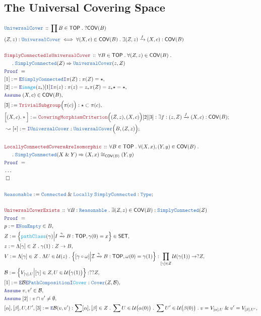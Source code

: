 \documentclass[12pt]{scrartcl}
\newcommand{\TYPE}[1]{\textcolor{NavyBlue}{\mathtt{#1}}}
\newcommand{\FUNC}[1]{\textcolor{Cerulean}{\mathtt{#1}}}
\newcommand{\LOGIC}[1]{\textcolor{Blue}{\mathtt{#1}}}
\newcommand{\THM}[1]{\textcolor{Maroon}{\mathtt{#1}}}
\renewcommand{\.}{\; . \;}
\newcommand{\de}{: \kern 0.1pc =}
\newcommand{\Theorem}[2]{& \THM{#1} \, :: \, #2 \\ & \Proof = \\ }
\newcommand{\DeclareType}[2]{& \TYPE{#1} \, :: \, #2 \\}
\newcommand{\DefineType}[3]{& #1 : \TYPE{#2} \iff #3 \\}
\newcommand{\NewLine}{\\ & \kern 1pc}
\newcommand{\Page}[1]{ \begin{align*} #1 \end{align*}   }
\newcommand{\NoProof}{ & \ldots \\ \EndProof}
\renewcommand{\And}{\; \& \;}
\newcommand{\Imply}{\Rightarrow}
\newcommand{\Intro}{\LOGIC{I}}
\newcommand{\Elim}{\LOGIC{E}}
\newcommand{\Type}{\TYPE{Type}}
\newcommand{\Arrow}{\xrightarrow}
\newcommand{\Say}[3]{& #1 \de #2 : #3, \\}
\newcommand{\SayIn}[3]{& #1 \de #2 \in #3, \\}
\newcommand{\Conclude}[3]{& #1 \de #2 : #3; \\}
\newcommand{\DeriveConclude}[3]{& \leadsto #1 \de #2 : #3 ; \\}
\newcommand{\Assume}[2]{& \LOGIC{Assume} \; #1 : #2, \\}
\newcommand{\AssumeIn}[2]{& \LOGIC{Assume} \; #1 \in #2, \\}
\newcommand{\QED}{\; \square}
\newcommand{\EndProof}{& \QED \\}
\newcommand{\Proof}{\LOGIC{Proof} \; }
\newcommand{\B}{\mathcal{B}}
\newcommand{\I}{\mathcal{I}}
\newcommand{\SET}{\mathsf{SET}}
\newcommand{\TOP}{\mathsf{TOP}}
\newcommand{\U}{\mathcal{U}}
\newcommand{\COV}{\mathsf{COV}}
\begin{document}
\subsection{The Universal Covering Space}
\Page{
	\DeclareType{UniversalCover}{\prod B \in \TOP \. ?\COV(B)  }
	\DefineType{(Z,z)}{UniversalCover}{
		\forall (X,c) \in \COV(B) \. 
		\exists (Z,z) \Arrow{f} (X,c) : \COV(B)
	}
	\\
	\Theorem{SimplyConnectedIsUniversalCover}
	{
		\forall B \in \TOP \.
		\forall ( Z, z) \in \COV(B) \. \NewLine \. 
		\TYPE{SimplyConnected}(Z) \Imply
		\TYPE{UniversalCover}(z,Z)
	}
	\Say{[1]}{\Elim \TYPE{SimplyConnected} \Intro \pi(Z)}
	{
		\pi(Z) = \star
	}
	\Say{[2]}{\Elim \FUNC{image}(z_*) [1] \Intro \pi(z)}
	{ 
		\pi(z) = z_* \pi(Z) = z_* \star = \star
	}
	\AssumeIn{(X,c)}{\COV(B)}
	\Say{[3]}{\THM{TrivialSubgroup}\Big( \pi(c) \Big)}{ \star \subset \pi(c) }
	\Conclude{\Big[(X,c).*\Big]}
	{
		\THM{CoveringMorphismCriterion}\Big((Z,z),(X,c)\Big)[2][3] 
	}
	{
		\exists f : (z,Z) \Arrow{f} (X,c) : \COV(B) 
	}
	\DeriveConclude{[*]}{\Intro \TYPE{UniversalCover}}
	{
		\TYPE{UniversalCover}\Big( B, (Z,z) \Big)
	}
	\\
	\Theorem{LocallyConnectedCoversAreIsomorphic}
	{
		\forall B \in \TOP \.
		\forall (X,x),(Y,y) \in \COV(B) \. \NewLine \. 
		\TYPE{SimplyConnected}(X \And Y) 
		\Imply
		(X,x) \cong_{\COV(B)} (Y,y)
	}
	\NoProof
	\\
	\Conclude{\TYPE{Reasonable}}{ \TYPE{Connected} \And \TYPE{Locally}\;\TYPE{SimplyConnected}}{\Type}
	\\
	\Theorem{UniversalCoverExists}
	{
		\forall B : \TYPE{Reasonable} \.  
		\exists (Z,z) \in \COV(B) :
		\TYPE{SimplyConnected}(Z)
	}
	\SayIn{p}{\Elim \TYPE{NonEmpty}}{B}
	\SayIn{Z}{\Big\{ \FUNC{pathClass}(\gamma)  \Big| I \Arrow{\gamma} B : \TOP, \gamma(0) = x  \Big\}}{\SET}
	\Say{z}{\Lambda [\gamma] \in Z \. \gamma(1) }{ Z \to B }
	\Say{V}{
		\Lambda [\gamma] \in Z \. 
		\Lambda U \in \U(z) \. 
		\Big\{
			[\gamma \circ \omega] 
			\Big|
			\I \Arrow{\gamma} B : \TOP,
			\omega(0) = \gamma(1)
		\Big\}
	}
	{
		\prod_{[\gamma] \in Z} \U(\gamma(1)) \to ?Z 
	}
	\Say{\B}{ \Big\{ V_{[\gamma],U} \Big| [\gamma] \in Z, U \in \U\big( \gamma(1) \big)  \Big\}  }
	{
		??Z
	}
	\Say{[1]}{\Elim \B \Elim \TYPE{PathComposition} \Intro \FUNC{Cover}}{\TYPE{Cover}(Z,\B)}
	\AssumeIn{v,v'}{\B}
	\Assume{[2]}{v \cap v' \neq \emptyset}
	\Say{[\alpha],[\beta],U,U',[3]}{\Elim \B(v,v')}
	{
		\sum [\alpha],[\beta] \in Z \.
		\sum U \in \U\big( \alpha(0) \big) \.
		\sum U' \in \U\big( \beta(0) \big) \.
		v = V_{[\alpha],U} \And v' = V_{[\beta],U'}
}}
\end{document}
